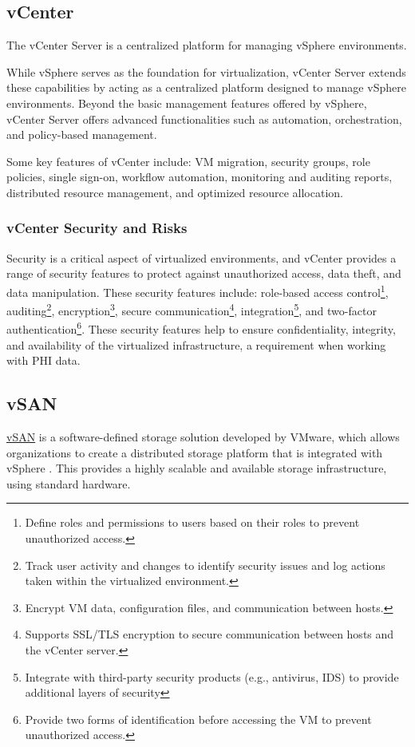 \subsection{vCenter}
The vCenter Server is a centralized platform for managing vSphere environments. 

While vSphere serves as the foundation for virtualization, vCenter Server extends these capabilities by acting as a centralized platform designed to manage vSphere environments. Beyond the basic management features offered by vSphere, vCenter Server offers advanced functionalities such as automation, orchestration, and policy-based management.

Some key features of vCenter include: VM migration, security groups, role policies, single sign-on, workflow automation, monitoring and auditing reports, distributed resource management, and optimized resource allocation.

\subsubsection{vCenter Security and Risks}
Security is a critical aspect of virtualized environments, and vCenter provides a range of security features to protect against unauthorized access, data theft, and data manipulation. These security features include: role-based access control\footnote{Define roles and permissions to users based on their roles to prevent unauthorized access.}, auditing\footnote{Track user activity and changes to identify security issues and log actions taken within the virtualized environment.}, encryption\footnote{Encrypt VM data, configuration files, and communication between hosts.}, secure communication\footnote{Supports SSL/TLS encryption to secure communication between hosts and the vCenter server.}, integration\footnote{Integrate with third-party security products (e.g., antivirus, IDS) to provide additional layers of security}, and two-factor authentication\footnote{Provide two forms of identification before accessing the VM to prevent unauthorized access.}. These security features help to ensure confidentiality, integrity, and availability of the virtualized infrastructure, a requirement when working with PHI data. 

\subsection{vSAN}
\href{https://docs.vmware.com/en/VMware-vSphere/7.0/com.vmware.vsphere.vsan-planning.doc/GUID-A80526C8-A941-4F84-9D44-D4B8B3914A95.html}{vSAN} is a software-defined storage solution developed by VMware, which allows organizations to create a distributed storage platform that is integrated with vSphere \cite{VMware3}. This provides a highly scalable and available storage infrastructure, using standard hardware.

